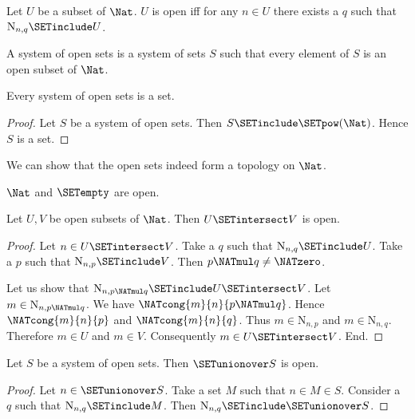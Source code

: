 \documentclass{article}
\newcommand{\N}{\mathrm{N}}
\begin{document}
  \begin{forthel}
    \begin{definition}
      Let $U$ be a subset of $\Nat$.
      $U$ is open iff for any $n \in U$ there exists a $q$ such that
      $\N_{n, q} \SETinclude U$.
    \end{definition}

    \begin{definition}
      A system of open sets is a system of sets $S$ such that every element of
      $S$ is an open subset of $\Nat$.
    \end{definition}

    \begin{lemma}
      Every system of open sets is a set.
    \end{lemma}
    \begin{proof}
      Let $S$ be a system of open sets.
      Then $S \SETinclude \SETpow(\Nat)$.
      Hence $S$ is a set.
    \end{proof}
  \end{forthel}

  We can show that the open sets indeed form a topology on $\Nat$.

  \begin{forthel}
    \begin{lemma}
      $\Nat$ and $\SETempty$ are open.
    \end{lemma}

    \begin{lemma}
      Let $U,V$ be open subsets of $\Nat$.
      Then $U \SETintersect V$ is open.
    \end{lemma}
    \begin{proof}
      Let $n \in U \SETintersect V$.
      Take a $q$ such that $\N_{n, q} \SETinclude U$.
      Take a $p$ such that $\N_{n, p} \SETinclude V$.
      Then $p \NATmul q \neq \NATzero$.

      Let us show that $\N_{n, p \NATmul q} \SETinclude U \SETintersect V$.
        Let $m \in \N_{n, p \NATmul q}$.
        We have $\NATcong{m}{n}{p \NATmul q}$.
        Hence $\NATcong{m}{n}{p}$ and $\NATcong{m}{n}{q}$.
        Thus $m \in \N_{n, p}$ and $m \in \N_{n, q}$.
        Therefore $m \in U$ and $m \in V$.
        Consequently $m \in U \SETintersect V$.
      End.
    \end{proof}

    \begin{lemma}
      Let $S$ be a system of open sets.
      Then $\SETunionover S$ is open.
    \end{lemma}
    \begin{proof}
      Let $n \in \SETunionover S$.
      Take a set $M$ such that $n \in M \in S$.
      Consider a $q$ such that $\N_{n, q} \SETinclude M$.
      Then $\N_{n, q} \SETinclude \SETunionover S$.
    \end{proof}
  \end{forthel}
\end{document}
